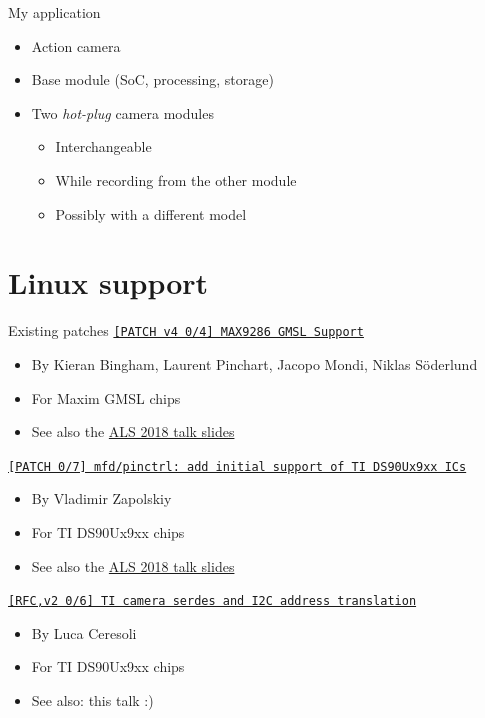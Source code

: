 \documentclass[xetex,table,aspectratio=169]{beamer}
\begin{document}
\begin{frame}{My application}
  \begin{itemize}
  \item Action camera
  \item Base module (SoC, processing, storage)
  \item Two {\em hot-plug} camera modules
    \begin{itemize}
    \item Interchangeable
    \item While recording from the other module
    \item Possibly with a different model
    \end{itemize}
  \end{itemize}
\end{frame}


\section{Linux support}

\begin{frame}{Existing patches}
  \href{https://lore.kernel.org/linux-media/20181102154723.23662-1-kieran.bingham@ideasonboard.com/}
         {\tt [PATCH v4 0/4] MAX9286 GMSL Support}
  \begin{itemize}
  \item By Kieran Bingham, Laurent Pinchart, Jacopo Mondi, Niklas Söderlund
  \item For Maxim GMSL chips
  \item See also the
    \href{https://www.slideshare.net/KieranBingham/gmsl-in-linux} {ALS
      2018 talk slides}
  \end{itemize}

  \href{https://lore.kernel.org/linux-media/20181008211205.2900-1-vz@mleia.com/}
       {\tt [PATCH 0/7] mfd/pinctrl: add initial support of TI DS90Ux9xx ICs}
  \begin{itemize}
  \item By Vladimir Zapolskiy
  \item For TI DS90Ux9xx chips
  \item See also the
    \href{https://schd.ws/hosted_files/ossalsjp18/8a/vzapolskiy_als2018.pdf}
           {ALS 2018 talk slides}
  \end{itemize}

  \href{https://lore.kernel.org/linux-media/20190723203723.11730-1-luca@lucaceresoli.net/}
       {\tt [RFC,v2 0/6] TI camera serdes and I2C address translation}
  \begin{itemize}
  \item By Luca Ceresoli
  \item For TI DS90Ux9xx chips
  \item See also: this talk :)
  \end{itemize}
\end{frame}
\end{document}
